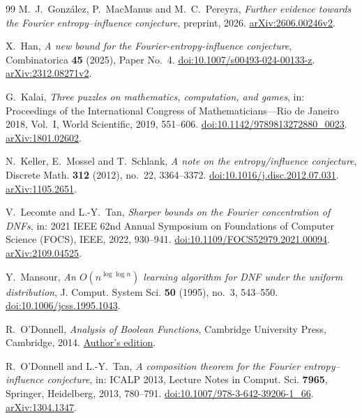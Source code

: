\documentclass[11pt]{amsart}
\theoremstyle{definition}
\theoremstyle{remark}
\begin{document}
\begin{thebibliography}{99}
M.~J.~Gonz\'alez, P.~MacManus and M.~C.~Pereyra,
\emph{Further evidence towards the Fourier entropy--influence conjecture},
preprint, 2026.
\href{https://arxiv.org/abs/2606.00246v2}{arXiv:2606.00246v2}.

X.~Han,
\emph{A new bound for the Fourier-entropy-influence conjecture},
Combinatorica \textbf{45} (2025), Paper No.~4.
\href{https://doi.org/10.1007/s00493-024-00133-z}{doi:10.1007/s00493-024-00133-z}.
\href{https://arxiv.org/abs/2312.08271v2}{arXiv:2312.08271v2}.

G.~Kalai,
\emph{Three puzzles on mathematics, computation, and games},
in: Proceedings of the International Congress of Mathematicians---Rio de Janeiro 2018, Vol.~I, World Scientific, 2019, 551--606.
\href{https://doi.org/10.1142/9789813272880_0023}{doi:10.1142/9789813272880\_0023}.
\href{https://arxiv.org/abs/1801.02602}{arXiv:1801.02602}.

N.~Keller, E.~Mossel and T.~Schlank,
\emph{A note on the entropy/influence conjecture},
Discrete Math. \textbf{312} (2012), no.~22, 3364--3372.
\href{https://doi.org/10.1016/j.disc.2012.07.031}{doi:10.1016/j.disc.2012.07.031}.
\href{https://arxiv.org/abs/1105.2651}{arXiv:1105.2651}.

V.~Lecomte and L.-Y.~Tan,
\emph{Sharper bounds on the Fourier concentration of DNFs},
in: 2021 IEEE 62nd Annual Symposium on Foundations of Computer Science (FOCS), IEEE, 2022, 930--941.
\href{https://doi.org/10.1109/FOCS52979.2021.00094}{doi:10.1109/FOCS52979.2021.00094}.
\href{https://arxiv.org/abs/2109.04525}{arXiv:2109.04525}.

Y.~Mansour,
\emph{An $O(n^{\log\log n})$ learning algorithm for DNF under the uniform distribution},
J. Comput. System Sci. \textbf{50} (1995), no.~3, 543--550.
\href{https://doi.org/10.1006/jcss.1995.1043}{doi:10.1006/jcss.1995.1043}.

R.~O'Donnell,
\emph{Analysis of Boolean Functions},
Cambridge University Press, Cambridge, 2014.
\href{https://www.cs.cmu.edu/~odonnell/papers/Analysis-of-Boolean-Functions-by-Ryan-ODonnell.pdf}{Author's edition}.

R.~O'Donnell and L.-Y.~Tan,
\emph{A composition theorem for the Fourier entropy--influence conjecture},
in: ICALP 2013, Lecture Notes in Comput. Sci. \textbf{7965}, Springer, Heidelberg, 2013, 780--791.
\href{https://doi.org/10.1007/978-3-642-39206-1_66}{doi:10.1007/978-3-642-39206-1\_66}.
\href{https://arxiv.org/abs/1304.1347}{arXiv:1304.1347}.


\end{thebibliography}
\end{document}
